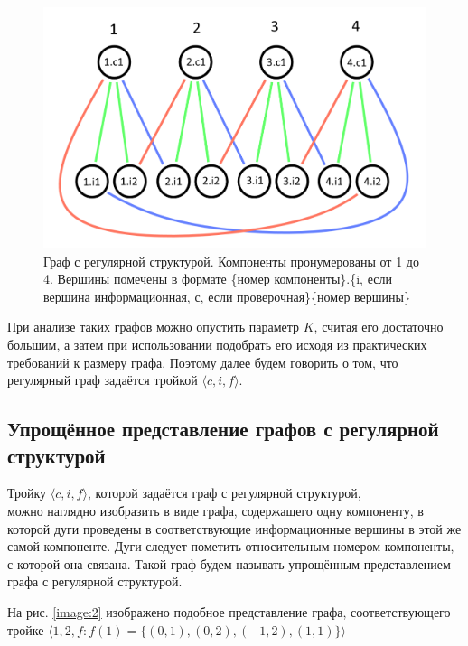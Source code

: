 \documentclass[14pt]{mmcs-article}
\begin{document}
\begin{figure}[H]
  \centering
  \includegraphics[scale=0.4]{Fig_1.png}
  \caption{ Граф с регулярной структурой. Компоненты пронумерованы от 1 до 4. Вершины помечены в формате \{номер компоненты\}.\{i, если вершина информационная, с, если проверочная\}\{номер вершины\} }\label{image:1}
\end{figure}

При анализе таких графов можно опустить параметр $K$, считая его достаточно большим, а затем при использовании подобрать его исходя из практических требований к размеру графа. Поэтому далее будем говорить о том, что регулярный граф задаётся тройкой $\langle c, i, f \rangle$.

\subsection{Упрощённое представление графов с регулярной структурой}

Тройку $\langle c, i, f \rangle$, которой задаётся граф с регулярной структурой,\\ можно наглядно изобразить в виде графа, содержащего одну компоненту, в которой дуги проведены в соответствующие информационные вершины в этой же самой компоненте. Дуги следует пометить относительным номером компоненты, с которой она связана. Такой граф будем называть упрощённым представлением графа с регулярной структурой.

На рис. \ref{image:2} изображено подобное представление графа, соответствующего тройке $\langle 1, 2, f: f(1) = \{ (0, 1), (0, 2), (-1, 2), (1, 1) \} \rangle$
\end{document}
